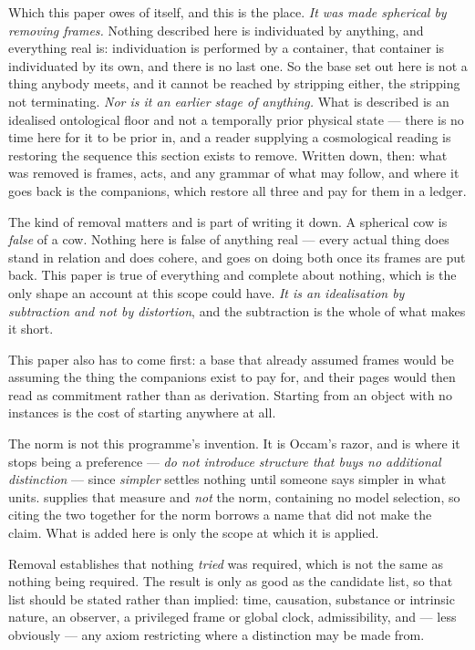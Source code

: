 \documentclass[11pt,a4paper]{article}
\begin{document}
Which this paper owes of itself, and this is the place. \emph{It was made spherical by removing frames.}
Nothing described here is individuated by anything, and everything real is: individuation is performed
by a container, that container is individuated by its own, and there is no last one. So the base set out
here is not a thing anybody meets, and it cannot be reached by stripping either, the stripping not
terminating. \emph{Nor is it an earlier stage of anything.} What is described is an idealised
ontological floor and not a temporally prior physical state --- there is no time here for it to be
prior in, and a reader supplying a cosmological reading is restoring the sequence this section exists
to remove. Written down, then: what was removed is frames, acts, and any grammar of what may follow,
and where it goes back is the companions, which restore all three and pay for them in a ledger.

The kind of removal matters and is part of writing it down. A spherical cow is \emph{false} of a cow.
Nothing here is false of anything real --- every actual thing does stand in relation and does cohere,
and goes on doing both once its frames are put back. This paper is true of everything and complete about
nothing, which is the only shape an account at this scope could have. \emph{It is an idealisation by
subtraction and not by distortion}, and the subtraction is the whole of what makes it short.

This paper also has to come first: a base that already assumed
frames would be assuming the thing the companions exist to pay for, and their pages would then read as
commitment rather than as derivation. Starting from an object with no instances is the cost of starting
anywhere at all.

The norm is not this programme's invention. It is Occam's razor, and \citet{rissanen1978} is where it
stops being a preference --- \emph{do not introduce structure that buys no additional distinction} ---
since \emph{simpler} settles nothing until someone says simpler in what units. \citet{shannon1948}
supplies that measure and \emph{not} the norm, containing no model selection, so citing the two
together for the norm borrows a name that did not make the claim. What is added here is only the scope at which it is applied.

Removal establishes that nothing \emph{tried} was required, which is not the same as nothing being
required. The result is only as good as the candidate list, so that list should be stated rather than
implied: time, causation, substance or intrinsic nature, an observer, a privileged frame or global
clock, admissibility, and --- less obviously --- any axiom restricting where a distinction may be made
from.
\end{document}

